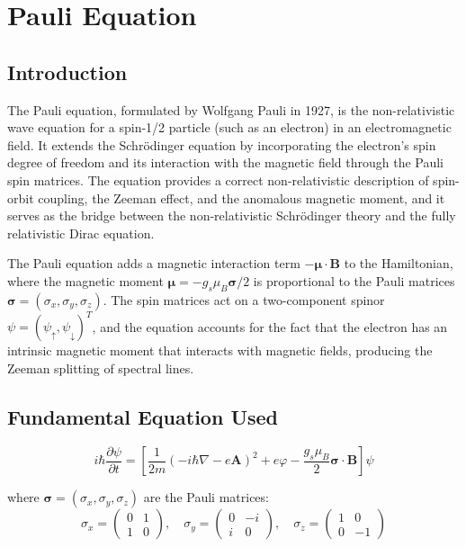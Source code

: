 \chapter{Pauli Equation}

\section*{Introduction}

The Pauli equation, formulated by Wolfgang Pauli in 1927, is the non-relativistic wave equation for a spin-1/2 particle (such as an electron) in an electromagnetic field. It extends the Schrödinger equation by incorporating the electron's spin degree of freedom and its interaction with the magnetic field through the Pauli spin matrices. The equation provides a correct non-relativistic description of spin-orbit coupling, the Zeeman effect, and the anomalous magnetic moment, and it serves as the bridge between the non-relativistic Schrödinger theory and the fully relativistic Dirac equation.

The Pauli equation adds a magnetic interaction term $-\boldsymbol{\mu}\cdot\mathbf{B}$ to the Hamiltonian, where the magnetic moment $\boldsymbol{\mu} = -g_{s}\mu_{B}\boldsymbol{\sigma}/2$ is proportional to the Pauli matrices $\boldsymbol{\sigma} = (\sigma_{x}, \sigma_{y}, \sigma_{z})$. The spin matrices act on a two-component spinor $\psi = (\psi_{\uparrow}, \psi_{\downarrow})^{T}$, and the equation accounts for the fact that the electron has an intrinsic magnetic moment that interacts with magnetic fields, producing the Zeeman splitting of spectral lines.
\section*{Fundamental Equation Used}

\begin{equation}
\boxed{\; i\hbar\frac{\partial\psi}{\partial t} = \left[\frac{1}{2m}\left(-i\hbar\nabla - e\mathbf{A}\right)^{2} + e\varphi - \frac{g_{s}\mu_{B}}{2}\boldsymbol{\sigma}\cdot\mathbf{B}\right]\psi\;}
\label{eq:pauli}
\end{equation}

where $\boldsymbol{\sigma} = (\sigma_{x}, \sigma_{y}, \sigma_{z})$ are the Pauli matrices:
\begin{equation}
\sigma_{x} = \begin{pmatrix}0&1\\1&0\end{pmatrix}, \quad
\sigma_{y} = \begin{pmatrix}0&-i\\i&0\end{pmatrix}, \quad
\sigma_{z} = \begin{pmatrix}1&0\\0&-1\end{pmatrix}
\label{eq:pauli-matrices}
\end{equation}
